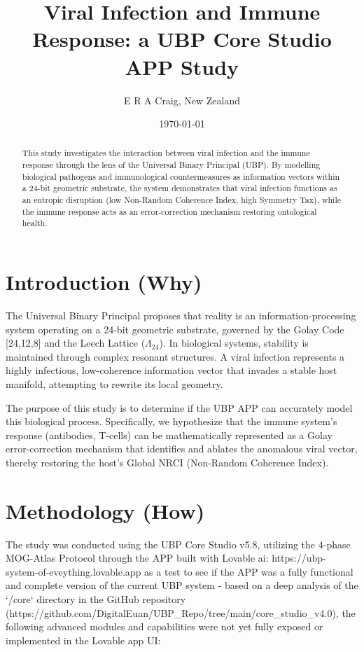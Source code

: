 \documentclass[11pt,a4paper]{article}
\title{Viral Infection and Immune Response: a UBP Core Studio APP Study}
\author{E R A Craig, New Zealand}
\date{\today}
\begin{document}
\maketitle

\begin{abstract}
This study investigates the interaction between viral infection and the immune response through the lens of the Universal Binary Principal (UBP). By modelling biological pathogens and immunological countermeasures as information vectors within a 24-bit geometric substrate, the system demonstrates that viral infection functions as an entropic disruption (low Non-Random Coherence Index, high Symmetry Tax), while the immune response acts as an error-correction mechanism restoring ontological health.
\end{abstract}

\section{Introduction (Why)}
The Universal Binary Principal proposes that reality is an information-processing system operating on a 24-bit geometric substrate, governed by the Golay Code [24,12,8] and the Leech Lattice ($\Lambda_{24}$). In biological systems, stability is maintained through complex resonant structures. A viral infection represents a highly infectious, low-coherence information vector that invades a stable host manifold, attempting to rewrite its local geometry.

The purpose of this study is to determine if the UBP APP can accurately model this biological process. Specifically, we hypothesize that the immune system's response (antibodies, T-cells) can be mathematically represented as a Golay error-correction mechanism that identifies and ablates the anomalous viral vector, thereby restoring the host's Global NRCI (Non-Random Coherence Index).

\section{Methodology (How)}
The study was conducted using the UBP Core Studio v5.8, utilizing the 4-phase MOG-Atlas Protocol through the APP built with Lovable ai: https://ubp-system-of-eveything.lovable.app as a test to see if the APP was a fully functional and complete version of the current UBP system - based on a deep analysis of the `/core` directory in the GitHub repository (https://github.com/DigitalEuan/UBP_Repo/tree/main/core_studio_v4.0), the following advanced modules and capabilities were not yet fully exposed or implemented in the Lovable app UI:
\end{document}
